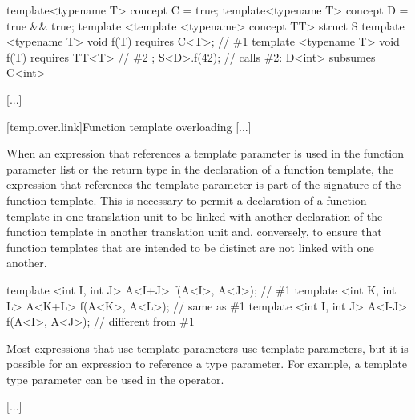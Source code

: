 \documentclass{wg21}
\begin{document}
\begin{addedblock}
\begin{example}
\begin{codeblock}
template<typename T> concept C = true;
template<typename T> concept D = true && true;
template <template <typename> concept TT>
struct S {
    template <typename T>
    void f(T) requires C<T>; // \#1
    template <typename T>
    void f(T) requires TT<T> // \#2
};
S<D>{}.f(42); // calls \#2: D<int> subsumes C<int>
\end{codeblock}
\end{example}
\end{addedblock}
\textcolor{noteclr}{[...]}

[temp.over.link]{Function template overloading}
\textcolor{noteclr}{[...]}

\pnum
When an expression that references a template parameter is used in the
function parameter list or the return type in the declaration of a
function template, the expression that references the template
parameter is part of the signature of the function template.
This is
necessary to permit a declaration of a function template in one
translation unit to be linked with another declaration of the function
template in another translation unit and, conversely, to ensure that
function templates that are intended to be distinct are not linked
with one another.
\begin{example}
    \begin{codeblock}
        template <int I, int J> A<I+J> f(A<I>, A<J>);   // \#1
        template <int K, int L> A<K+L> f(A<K>, A<L>);   // same as \#1
        template <int I, int J> A<I-J> f(A<I>, A<J>);   // different from \#1
    \end{codeblock}
\end{example}
\begin{note}
    Most expressions that use template parameters use  template
    parameters, but it is possible for an expression to reference a type
    parameter.
    For example, a template type parameter can be used in the
     operator.
\end{note}

\textcolor{noteclr}{[...]}
\end{document}
